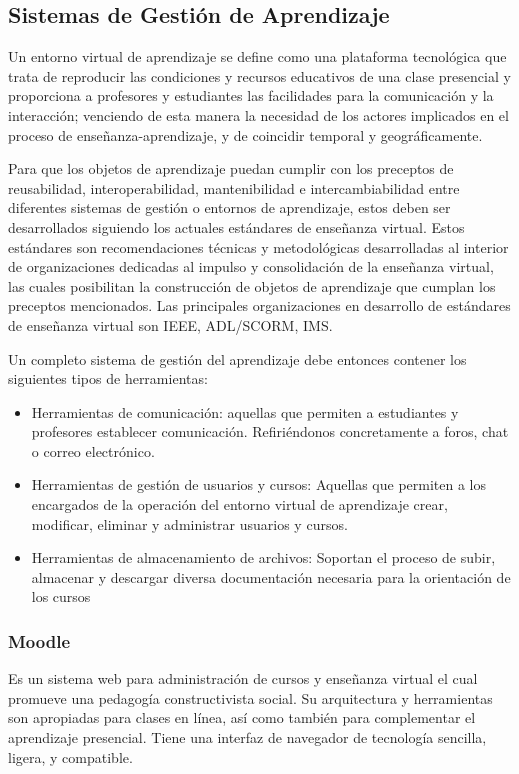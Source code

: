 \documentclass[letterpaper, 11pt, oneside]{article}
\theoremstyle{definition}
\theoremstyle{remark}
\begin{document}
\subsection{Sistemas de Gestión de Aprendizaje}

Un entorno virtual de aprendizaje se define como una plataforma tecnológica que trata de reproducir las condiciones y recursos educativos de una clase presencial y proporciona a profesores y estudiantes las facilidades para la comunicación y la interacción; venciendo de esta manera la necesidad de los actores implicados en el proceso de enseñanza-aprendizaje, y de coincidir temporal y geográficamente. \cite{Dorado06}

Para que los objetos de aprendizaje puedan cumplir con los preceptos de reusabilidad, interoperabilidad, mantenibilidad e intercambiabilidad entre diferentes sistemas de gestión o entornos de aprendizaje, estos deben ser desarrollados siguiendo los actuales estándares de enseñanza virtual\cite{Fernandez2006}. Estos estándares son recomendaciones técnicas y metodológicas desarrolladas al interior de organizaciones dedicadas al impulso y consolidación de la enseñanza virtual, las cuales posibilitan la construcción de objetos de aprendizaje que cumplan los preceptos mencionados. Las principales organizaciones en desarrollo de estándares de enseñanza virtual son IEEE\cite{IEEE2006}, ADL/SCORM\cite{SCORM2006}, IMS\cite{IMS2006}.

Un completo sistema de gestión del aprendizaje debe entonces contener los siguientes tipos de herramientas:

\begin{itemize}
\item Herramientas de comunicación: aquellas que permiten a estudiantes y profesores establecer comunicación. Refiriéndonos concretamente a foros, chat o correo electrónico.
\item Herramientas de gestión de usuarios y cursos: Aquellas que permiten a los encargados de la operación del entorno virtual de aprendizaje crear, modificar, eliminar y administrar usuarios y cursos.
\item Herramientas de almacenamiento de archivos: Soportan el proceso de subir, almacenar y descargar diversa documentación necesaria para la orientación de los cursos
\end{itemize}

\subsubsection{Moodle}Es un sistema web para administración de cursos y enseñanza virtual el cual promueve una pedagogía constructivista social. Su arquitectura y herramientas son apropiadas para clases en línea, así como también para complementar el aprendizaje presencial. Tiene una interfaz de navegador de tecnología sencilla, ligera, y compatible.
\end{document}
